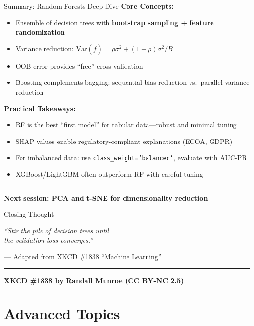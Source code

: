 \documentclass[8pt,aspectratio=169]{beamer}
\newcommand{\bottomnote}[1]{%
\vfill
\vspace{-2mm}
\textcolor{mllavender2}{\rule{\textwidth}{0.4pt}}
\vspace{1mm}
\footnotesize
\textbf{#1}
}
\begin{document}
\begin{frame}[t]{Summary: Random Forests Deep Dive}
\textbf{Core Concepts:}
\begin{itemize}
\item Ensemble of decision trees with \textbf{bootstrap sampling + feature randomization}
\item Variance reduction: $\text{Var}(\bar{f}) = \rho\sigma^2 + (1-\rho)\sigma^2/B$
\item OOB error provides ``free'' cross-validation
\item Boosting complements bagging: sequential bias reduction vs.\ parallel variance reduction
\end{itemize}

\vspace{0.3em}
\textbf{Practical Takeaways:}
\begin{itemize}
\item RF is the best ``first model'' for tabular data---robust and minimal tuning
\item SHAP values enable regulatory-compliant explanations (ECOA, GDPR)
\item For imbalanced data: use \texttt{class\_weight='balanced'}, evaluate with AUC-PR
\item XGBoost/LightGBM often outperform RF with careful tuning
\end{itemize}
\bottomnote{Next session: PCA and t-SNE for dimensionality reduction}
\end{frame}

\begin{frame}{Closing Thought}
\begin{center}
\Large
\textit{``Stir the pile of decision trees until\\[0.3em] the validation loss converges.''}
\end{center}

\vspace{1em}
\begin{center}
\normalsize
--- Adapted from XKCD \#1838 ``Machine Learning''
\end{center}
\bottomnote{XKCD \#1838 by Randall Munroe (CC BY-NC 2.5)}
\end{frame}

\appendix
\section*{Advanced Topics}
\end{document}
